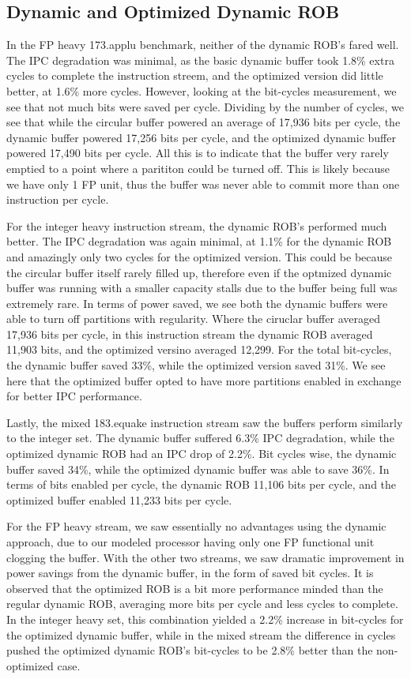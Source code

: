 \subsection{Dynamic and Optimized Dynamic ROB}
In the FP heavy 173.applu benchmark, neither of the dynamic ROB's fared well. The IPC degradation was minimal, as the basic dynamic buffer took 1.8\% extra cycles to complete the instruction streem, and the optimized version did little better, at 1.6\% more cycles. However, looking at the bit-cycles measurement, we see that not much bits were saved per cycle. Dividing by the number of cycles, we see that while the circular buffer powered an average of 17,936 bits per cycle, the dynamic buffer powered 17,256 bits per cycle, and the optimized dynamic buffer powered 17,490 bits per cycle. All this is to indicate that the buffer very rarely emptied to a point where a parititon could be turned off. This is likely because we have only 1 FP unit, thus the buffer was never able to commit more than one instruction per cycle.

For the integer heavy instruction stream, the dynamic ROB's performed much better. The IPC degradation was again minimal, at 1.1\% for the dynamic ROB and amazingly only two cycles for the optimized version. This could be because the circular buffer itself rarely filled up, therefore even if the optmized dynamic buffer was running with a smaller capacity stalls due to the buffer being full was extremely rare. In terms of power saved, we see both the dynamic buffers were able to turn off partitions with regularity. Where the ciruclar buffer averaged 17,936 bits per cycle, in this instruction stream the dynamic ROB averaged 11,903 bits, and the optimized versino averaged 12,299. For the total bit-cycles, the dynamic buffer saved 33\%, while the optimized version saved 31\%. We see here that the optimized buffer opted to have more partitions enabled in exchange for better IPC performance.

Lastly, the mixed 183.equake instruction stream saw the buffers perform similarly to the integer set. The dynamic buffer suffered 6.3\% IPC degradation, while the optimized dynamic ROB had an IPC drop of 2.2\%. Bit cycles wise, the dynamic buffer saved 34\%, while the optimized dynamic buffer was able to save 36\%. In terms of bits enabled per cycle, the dynamic ROB 11,106 bits per cycle, and the optimized buffer enabled 11,233 bits per cycle.

For the FP heavy stream, we saw essentially no advantages using the dynamic approach, due to our modeled processor having only one FP functional unit clogging the buffer. With the other two streams, we saw dramatic improvement in power savings from the dynamic buffer, in the form of saved bit cycles. It is observed that the optimized ROB is a bit more performance minded than the regular dynamic ROB, averaging more bits per cycle and less cycles to complete. In the integer heavy set, this combination yielded a 2.2\% increase in bit-cycles for the optimized dynamic buffer, while in the mixed stream the difference in cycles pushed the optimized dynamic ROB's bit-cycles to be 2.8\% better than the non-optimized case.

